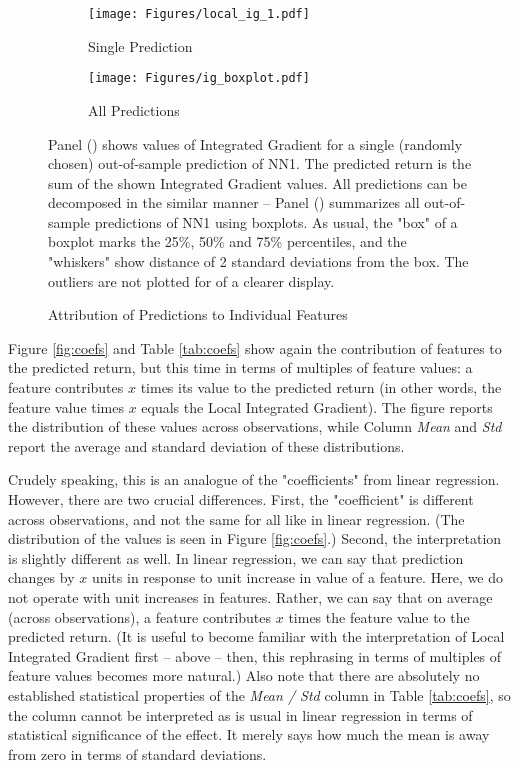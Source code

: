 	\begin{figure}	
		\centering		
		\begin{subfigure}[t]{\textwidth}
			\texttt{[image: Figures/local\_ig\_1.pdf]}
			\caption{Single Prediction}
			\label{fig:local_ig_1}
		\end{subfigure}
		
		\begin{subfigure}[t]{\textwidth}
			\centering
			\texttt{[image: Figures/ig\_boxplot.pdf]}
			\caption{All Predictions}
			\label{fig:local_ig_boxplot}
		\end{subfigure}
		\caption{Attribution of Predictions to Individual Features}
		\medskip
		\small
		Panel () shows values of Integrated Gradient for a single (randomly chosen) out-of-sample prediction of NN1. The predicted return is the sum of the shown Integrated Gradient values. All predictions can be decomposed in the similar manner -- Panel () summarizes all out-of-sample predictions of NN1 using boxplots. As usual, the "box" of a boxplot marks the 25\%, 50\% and 75\% percentiles, and the "whiskers" show distance of 2 standard deviations from the box. The outliers are not plotted for of a clearer display.
		\label{fig:local_ig}
	\end{figure}

	
	Figure \ref{fig:coefs} and Table \ref{tab:coefs} show again the contribution of features to the predicted return, but this time in terms of multiples of feature values: a feature contributes $x$ times its value to the predicted return (in other words, the feature value times $x$ equals the Local Integrated Gradient). The figure reports the distribution of these values across observations, while Column \textit{Mean} and \textit{Std} report the average and standard deviation of these distributions.  
	
	Crudely speaking, this is an analogue of the "coefficients" from linear regression. 
	However, there are two crucial differences. First, the "coefficient" is different across observations, and not the same for all like in linear regression. (The distribution of the values is seen in Figure \ref{fig:coefs}.) Second, the interpretation is slightly different as well. In linear regression, we can say that prediction changes by $x$ units in response to unit increase in value of a feature. Here, we do not operate with unit increases in features. Rather, we can say that on average (across observations), a feature contributes $x$ times the feature value to the predicted return. (It is useful to become familiar with the interpretation of Local Integrated Gradient first -- above -- then, this rephrasing in terms of multiples of feature values becomes more natural.) Also note that there are absolutely no established statistical properties of the \textit{Mean / Std} column in Table \ref{tab:coefs}, so the column cannot be interpreted as is usual in linear regression in terms of statistical significance of the effect. It merely says how much the mean is away from zero in terms of standard deviations. 
	
